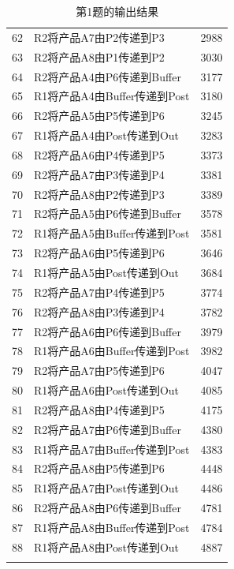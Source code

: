 \documentclass{ctexart}
\begin{document}
{{\begin{longtable}{clc}
        62 & R2将产品A7由P2传递到P3 & 2988 \\
        63 & R2将产品A8由P1传递到P2 & 3030 \\
        64 & R2将产品A4由P6传递到Buffer & 3177 \\
        65 & R1将产品A4由Buffer传递到Post & 3180 \\
        66 & R2将产品A5由P5传递到P6 & 3245 \\
        67 & R1将产品A4由Post传递到Out & 3283 \\
        68 & R2将产品A6由P4传递到P5 & 3373 \\
        69 & R2将产品A7由P3传递到P4 & 3381 \\
        70 & R2将产品A8由P2传递到P3 & 3389 \\
        71 & R2将产品A5由P6传递到Buffer & 3578 \\
        72 & R1将产品A5由Buffer传递到Post & 3581 \\
        73 & R2将产品A6由P5传递到P6 & 3646 \\
        74 & R1将产品A5由Post传递到Out & 3684 \\
        75 & R2将产品A7由P4传递到P5 & 3774 \\
        76 & R2将产品A8由P3传递到P4 & 3782 \\
        77 & R2将产品A6由P6传递到Buffer & 3979 \\
        78 & R1将产品A6由Buffer传递到Post & 3982 \\
        79 & R2将产品A7由P5传递到P6 & 4047 \\
        80 & R1将产品A6由Post传递到Out & 4085 \\
        81 & R2将产品A8由P4传递到P5 & 4175 \\
        82 & R2将产品A7由P6传递到Buffer & 4380 \\
        83 & R1将产品A7由Buffer传递到Post & 4383 \\
        84 & R2将产品A8由P5传递到P6 & 4448 \\
        85 & R1将产品A7由Post传递到Out & 4486 \\
        86 & R2将产品A8由P6传递到Buffer & 4781 \\
        87 & R1将产品A8由Buffer传递到Post & 4784 \\
        88 & R1将产品A8由Post传递到Out & 4887 \\
        
            
            \bottomrule
            
            \caption{第1题的输出结果}
        \end{longtable}

}}
\end{document}
